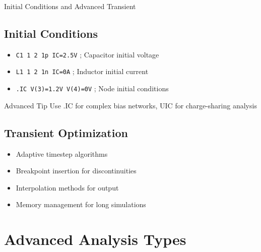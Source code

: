 \documentclass{beamer}
\begin{document}
\begin{frame}{Initial Conditions and Advanced Transient}
    \subsection{Initial Conditions}
    \begin{itemize}
        \item \texttt{C1 1 2 1p IC=2.5V} ; Capacitor initial voltage
        \item \texttt{L1 1 2 1n IC=0A} ; Inductor initial current
        \item \texttt{.IC V(3)=1.2V V(4)=0V} ; Node initial conditions
    \end{itemize}
    
    \begin{alertblock}{Advanced Tip}
        Use .IC for complex bias networks, UIC for charge-sharing analysis
    \end{alertblock}
    
    \subsection{Transient Optimization}
    \begin{itemize}
        \item Adaptive timestep algorithms
        \item Breakpoint insertion for discontinuities
        \item Interpolation methods for output
        \item Memory management for long simulations
    \end{itemize}
\end{frame}

\section{Advanced Analysis Types}
\end{document}
